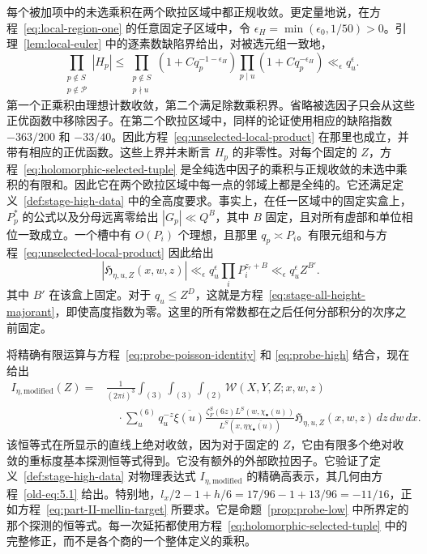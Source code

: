 \documentclass[11pt,a4paper]{article}
\numberwithin{equation}{section}
\numberwithin{figure}{section}
\theoremstyle{definition}
\theoremstyle{remark}
\begin{document}
每个被加项中的未选乘积在两个欧拉区域中都正规收敛。更定量地说，在方程~\eqref{eq:local-region-one} 的任意固定子区域中，令 $\epsilon_H=\min(\epsilon_0,1/50)>0$。引理~\ref{lem:local-euler} 中的逐素数缺陷界给出，对被选元组一致地，
\begin{equation}\label{eq:unselected-local-product}
 \prod_{\substack{p\notin S\\p\notin\mathcal P}}|H_p|
 \le
 \prod_{\substack{p\notin S\\p\nmid u}}
       (1+Cq_p^{-1-\epsilon_H})
 \prod_{p\mid u}(1+Cq_p^{-\epsilon_H})
 \ll_\epsilon q_u^\epsilon.
\end{equation}
第一个正乘积由理想计数收敛，第二个满足除数乘积界。省略被选因子只会从这些正优函数中移除因子。在第二个欧拉区域中，同样的论证使用相应的缺陷指数 $-363/200$ 和 $-33/40$。因此方程~\eqref{eq:unselected-local-product} 在那里也成立，并带有相应的正优函数。这些上界并未断言 $H_p$ 的非零性。对每个固定的 $Z$，方程~\eqref{eq:holomorphic-selected-tuple} 是全纯选中因子的乘积与正规收敛的未选中乘积的有限和。因此它在两个欧拉区域中每一点的邻域上都是全纯的。它还满足定义~\ref{def:stage-high-data} 中的全高度要求。事实上，在任一区域中的固定实盒上，$P_p^*$ 的公式以及分母远离零给出 $|G_p|\ll Q^B$，其中 $B$ 固定，且对所有虚部和单位相位一致成立。一个槽中有 $O(P_i)$ 个理想，且那里 $q_p\asymp P_i$。有限元组和与方程~\eqref{eq:unselected-local-product} 因此给出
\begin{equation}\label{eq:compensated-all-height-majorant}
 |\mathfrak H_{\eta,u,Z}(x,w,z)|
 \ll_\epsilon q_u^\epsilon\prod_iP_i^{z_r+B}
 \ll_\epsilon q_u^\epsilon Z^{B'}.
\end{equation}
其中 $B'$ 在该盒上固定。对于 $q_u\le Z^D$，这就是方程~\eqref{eq:stage-all-height-majorant}，即使高度指数为零。这里的所有常数都在之后任何分部积分的次序之前固定。

将精确有限运算与方程~\eqref{eq:probe-poisson-identity} 和 \eqref{eq:probe-high} 结合，现在给出
\begin{equation}\label{eq:compensated-poisson-identity}
\begin{split}
 I_{\eta,\mathrm{modified}}(Z)
 ={}&\frac1{(2\pi i)^3}\int_{(3)}\int_{(3)}\int_{(2)}
       \mathcal W(X,Y,Z;x,w,z)\\
 &\quad\cdot\sum_u^{(6)}q_u^{-z}\overline{\xi(u)}
       \frac{\zeta_F^S(6z)L^S(w,\chi_\bullet(u))}
       {L^S(x,\eta\overline{\chi_\bullet(u)})}
       \mathfrak H_{\eta,u,Z}(x,w,z)\,dz\,dw\,dx.
\end{split}
\end{equation}
该恒等式在所显示的直线上绝对收敛，因为对于固定的 $Z$，它由有限多个绝对收敛的重标度基本探测恒等式得到。它没有额外的外部欧拉因子。它验证了定义~\ref{def:stage-high-data} 对物理表达式 $I_{\eta,\mathrm{modified}}$ 的精确高表示，其几何由方程~\eqref{old-eq:5.1} 给出。特别地，$l_x/2-1+h/6=17/96-1+13/96=-11/16$，正如方程~\eqref{eq:part-II-mellin-target} 所要求。它是命题~\ref{prop:probe-low} 中所界定的那个探测的恒等式。每一次延拓都使用方程~\eqref{eq:holomorphic-selected-tuple} 中的完整修正，而不是各个商的一个整体定义的乘积。
\end{document}
